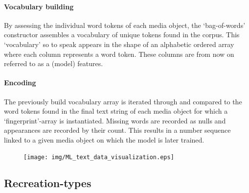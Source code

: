 \paragraph{Vocabulary building} By assessing the individual word tokens of each media object, the ‘bag-of-words’ constructor assembles a vocabulary of unique tokens found in the corpus. This ‘vocabulary’ so to speak appears in the shape of an alphabetic ordered array where each column represents a word token. These columns are from now on referred to as a (model) features.

\paragraph{Encoding} The previously build vocabulary array is iterated through and compared to the word tokens found in the final text string of each media object for which a ‘fingerprint’-array is instantiated. Missing words are recorded as nulls and appearances are recorded by their count. This results in a number sequence linked to a given media object on which the model is later trained.

\begin{figure}[h]
   \centering
   \texttt{[image: img/ML\_text\_data\_visualization.eps]}
   \caption{}
   \label{fig:ml_visualisation}
\end{figure}

\subsection{Recreation-types}










